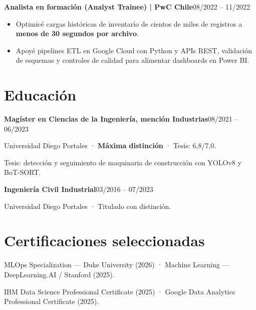 \documentclass[10pt,a4paper]{article}
\newcommand{\entry}[2]{\par\addvspace{3pt}\textbf{#1}\hfill{\fontsize{9.5}{11}\selectfont\color{muted}#2}\par\nopagebreak}
\begin{document}
\entry{Analista en formación (Analyst Trainee) | PwC Chile}{08/2022 -- 11/2022}
\begin{itemize}
  \item Optimicé cargas históricas de inventario de cientos de miles de registros a \textbf{menos de 30 segundos por archivo}.
  \item Apoyé pipelines ETL en Google Cloud con Python y APIs REST, validación de esquemas y controles
  de calidad para alimentar dashboards en Power BI.
\end{itemize}

\section{Educación}
\entry{Magíster en Ciencias de la Ingeniería, mención Industrias}{08/2021 -- 06/2023}
Universidad Diego Portales · \textbf{Máxima distinción} · Tesis: 6,8/7,0.\par
Tesis: detección y seguimiento de maquinaria de construcción con YOLOv8 y BoT-SORT.\par
\entry{Ingeniería Civil Industrial}{03/2016 -- 07/2023}
Universidad Diego Portales · Titulado con distinción.

\section{Certificaciones seleccionadas}
MLOps Specialization — Duke University (2026) · Machine Learning — DeepLearning.AI / Stanford (2025).\par
IBM Data Science Professional Certificate (2025) · Google Data Analytics Professional Certificate (2025).
\end{document}
